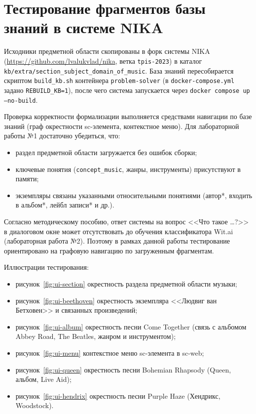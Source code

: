 \section{Тестирование фрагментов базы знаний в системе NIKA}
\label{sec:part2}

Исходники предметной области скопированы в форк системы NIKA (\url{https://github.com/lvalukvlad/nika}, ветка \texttt{tpis-2023}) в каталог \texttt{kb/extra/section\_subject\_domain\_of\_music}. База знаний пересобирается скриптом \texttt{build\_kb.sh} контейнера \texttt{problem-solver} (в \texttt{docker-compose.yml} задано \texttt{REBUILD\_KB=1}), после чего система запускается через \texttt{docker compose up --no-build}.

Проверка корректности формализации выполняется средствами навигации по базе знаний (граф окрестности sc-элемента, контекстное меню). Для лабораторной работы №1 достаточно убедиться, что:
\begin{itemize}
	\item раздел предметной области загружается без ошибок сборки;
	\item ключевые понятия (\texttt{concept\_music}, жанры, инструменты) присутствуют в памяти;
	\item экземпляры связаны указанными относительными понятиями (автор*, входить в альбом*, лейбл записи* и др.).
\end{itemize}

Согласно методическому пособию, ответ системы на вопрос <<Что такое \ldots?>> в диалоговом окне может отсутствовать до обучения классификатора Wit.ai (лабораторная работа №2). Поэтому в рамках данной работы тестирование ориентировано на графовую навигацию по загруженным фрагментам.

Иллюстрации тестирования:
\begin{itemize}
	\item рисунок~\ref{fig:ui-section} \mdash окрестность раздела предметной области музыки;
	\item рисунок~\ref{fig:ui-beethoven} \mdash окрестность экземпляра <<Людвиг ван Бетховен>> и связанных произведений;
	\item рисунок~\ref{fig:ui-album} \mdash окрестность песни Come Together (связь с альбомом Abbey Road, The Beatles, жанром и инструментом);
	\item рисунок~\ref{fig:ui-menu} \mdash контекстное меню sc-элемента в sc-web;
	\item рисунок~\ref{fig:ui-queen} \mdash окрестность песни Bohemian Rhapsody (Queen, альбом, Live Aid);
	\item рисунок~\ref{fig:ui-hendrix} \mdash окрестность песни Purple Haze (Хендрикс, Woodstock).
\end{itemize}


